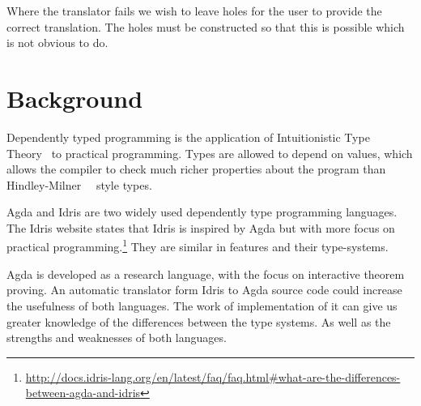 \documentclass[parskip=half]{scrartcl}
\begin{document}
Where the translator fails we wish to leave holes for the user to provide the
correct translation. The holes must be constructed so that this is possible
which is not obvious to do.







\section{Background}

Dependently typed programming is the application of
Intuitionistic Type Theory~\cite{martinlof} to practical programming.  Types
are allowed to depend on values, which allows the compiler to check much richer
properties about the program than Hindley-Milner~\cite{hindley}~\cite{milner}
style types.

Agda and Idris are two widely used dependently type programming languages.
The Idris website states that Idris is inspired
by Agda but with more focus on practical
programming.\footnote{\url{http://docs.idris-lang.org/en/latest/faq/faq.html\#what-are-the-differences-between-agda-and-idris}}
They are similar in features and their type-systems.

Agda is developed as a research language, with the focus on interactive theorem
proving.  An automatic translator form Idris to Agda source code could increase
the usefulness of both languages. The work of implementation of it can give us
greater knowledge of the differences between the type systems. As well as the
strengths and weaknesses of both languages.
\end{document}
